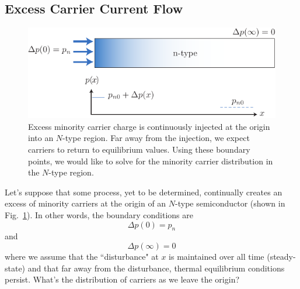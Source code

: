 \subsection{Excess Carrier Current Flow}
\begin{figure}[tb]
\centering
\includegraphics[width=.75\columnwidth]{excess_charge_inject}
\caption{Excess minority carrier charge is continuously injected at the origin into an $N$-type region.  Far away from the injection, we expect carriers to return to equilibrium values.  Using these boundary points, we would like to solve for the minority carrier distribution in the $N$-type region.} \label{fig:excess_charge_inject}
\end{figure}
Let's suppose that some process, yet to be determined, continually creates an excess of minority carriers at the origin of an $N$-type semiconductor (shown in Fig.~\ref{fig:excess_charge_inject}).  In other words, the boundary conditions are
    \begin{equation}
        \Delta p(0) = p_{n}
    \end{equation}	
and
    \begin{equation}
        \Delta p(\infty) = 0
    \end{equation}	
where we assume that the ``disturbance" at $x$ is maintained over all time (steady-state) and that far away from the disturbance, thermal equilibrium conditions persist.  What's the distribution of carriers as we leave the origin?  
